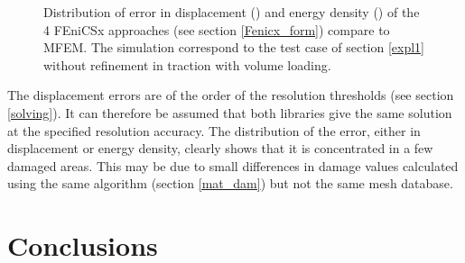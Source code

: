 \documentclass[12pt]{article}
\newcommand{\f}[1]{FEniCSx#1}
\begin{document}
\begin{figure}	
	\caption{Distribution of error in displacement (\protect{}) and energy density (\protect{}) of the 4 \f{} approaches (see section \ref{Fenicx_form}) compare to MFEM. The simulation correspond to the test case of section \ref{expl1} without refinement in traction with  volume loading.\label{error_ref0}}
\end{figure}

The displacement errors are of the order of the resolution thresholds (see section \ref{solving}). It can therefore be assumed that both libraries  give the same solution at the specified resolution accuracy. 
The distribution of the error, either in displacement or energy density, clearly shows that it is concentrated in a few damaged areas.  
This may be due to small differences in damage values calculated using the same algorithm (section \ref{mat_dam}) but not the same mesh database.



\section{Conclusions}\label{conclusions}
\end{document}
